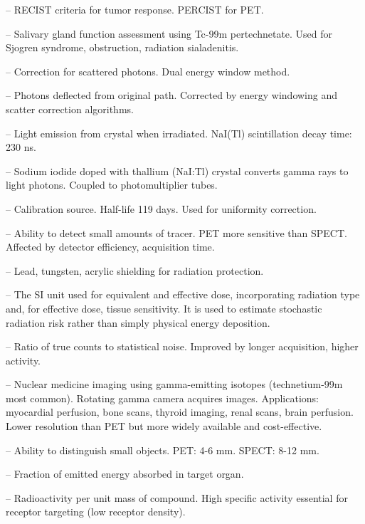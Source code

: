 -- RECIST criteria for tumor response. PERCIST for PET.

-- Salivary gland function assessment using Tc-99m pertechnetate. Used for Sjogren syndrome, obstruction, radiation sialadenitis.

-- Correction for scattered photons. Dual energy window method.

-- Photons deflected from original path. Corrected by energy windowing and scatter correction algorithms.

-- Light emission from crystal when irradiated. NaI(Tl) scintillation decay time: 230 ns.

-- Sodium iodide doped with thallium (NaI:Tl) crystal converts gamma rays to light photons. Coupled to photomultiplier tubes.

-- Calibration source. Half-life 119 days. Used for uniformity correction.

-- Ability to detect small amounts of tracer. PET more sensitive than SPECT. Affected by detector efficiency, acquisition time.

-- Lead, tungsten, acrylic shielding for radiation protection.

-- The SI unit used for equivalent and effective dose, incorporating radiation type and, for effective dose, tissue sensitivity. It is used to estimate stochastic radiation risk rather than simply physical energy deposition.

-- Ratio of true counts to statistical noise. Improved by longer acquisition, higher activity.

-- Nuclear medicine imaging using gamma-emitting isotopes (technetium-99m most common). Rotating gamma camera acquires images. Applications: myocardial perfusion, bone scans, thyroid imaging, renal scans, brain perfusion. Lower resolution than PET but more widely available and cost-effective.

-- Ability to distinguish small objects. PET: 4-6 mm. SPECT: 8-12 mm.

-- Fraction of emitted energy absorbed in target organ.

-- Radioactivity per unit mass of compound. High specific activity essential for receptor targeting (low receptor density).

